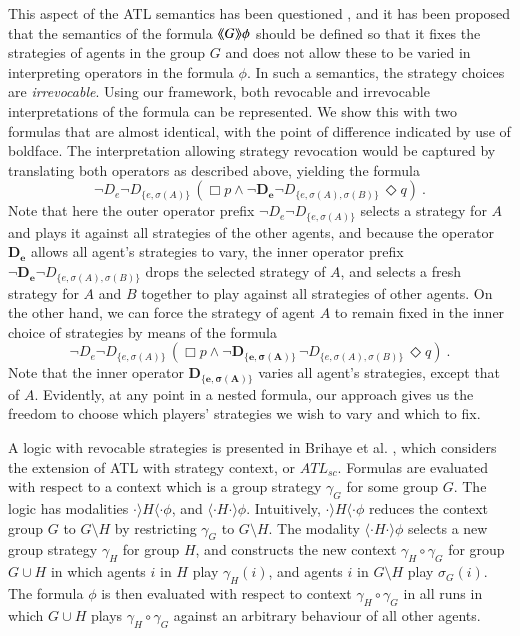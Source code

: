 \documentclass[a4wide]{article}
\theoremstyle{examplesty}
\newcommand{\strat}{\sigma}
\newcommand{\atlop}[1]{\langle\hspace{-2pt}\langle #1 \rangle \hspace{-2pt}\rangle }
\newcommand{\always}{\Box}
\newcommand{\sometimes}{\Diamond}
\begin{document}
This aspect of the ATL semantics has been questioned 
\cite{AgotnesGJ07}, and it has been proposed that the semantics of the formula
$\atlop{G} \phi$ should be defined so that it fixes the strategies of agents in 
the group $G$ and does not allow these to be varied in interpreting operators in the 
formula $\phi$. In such a semantics, the strategy choices are \emph{irrevocable}. 
Using our framework, both revocable and irrevocable interpretations of the formula can be represented. 
We show this with two formulas that 
are almost identical, with the point of difference indicated by use of boldface.
The interpretation allowing strategy revocation would be captured
by translating both operators as described above, yielding the formula 
$$ \neg D_{e} \neg D_{\{e,\strat(A)\} }\,( \always p \land  \neg \mathbf{D_{e}} \neg D_{\{e,\strat(A),\strat(B)\} } \,\sometimes q)~.$$ 
Note that here the outer operator prefix $\neg D_{e} \neg D_{\{e,\strat(A)\} }$ selects a strategy for $A$ and plays it against 
all strategies of the other agents, and because the operator $\mathbf{D_{e}}$ allows all agent's strategies to vary, 
the inner operator prefix $\neg \mathbf{D_{e}} \neg D_{\{e,\strat(A),\strat(B)\} }$ 
drops the selected strategy of $A$, and selects a fresh strategy for $A$ and $B$ together to play against all strategies of other agents. 
On the other hand, we can force the strategy of agent $A$ to remain fixed
in the inner choice of strategies by  means of the formula
$$ \neg D_{e} \neg D_{\{e,\strat(A)\} }\,( \always p \land  \neg \mathbf{D_{\{e,\strat(A)\}}}\, \neg D_{\{e,\strat(A),\strat(B)\} } \, \sometimes q)~.$$  
Note that the inner operator $\mathbf{D_{\{e,\strat(A)\}}}$ varies all agent's strategies, except that of $A$. 
Evidently, at any point in a nested formula, our approach gives us the freedom
to choose which players' strategies we wish to vary and which  to fix. 



A logic with 
revocable strategies is presented in
Brihaye et al. \cite{BCLM2009},  which 
considers the extension of ATL with strategy context, or $ATL_{sc}$. 
Formulas are evaluated with respect to a context which is a group strategy $\gamma_G$ for some group $G$. 
The logic has modalities $\cdot\rangle H \langle\cdot\phi$, and $ \langle\cdot H \cdot\rangle\phi$.  
Intuitively,  $\cdot\rangle H \langle\cdot\phi$ reduces the context group $G$ to $G\setminus H$ by restricting $\gamma_G$ to $G \setminus H$. 
The modality $ \langle\cdot H \cdot\rangle\phi$ selects a new group strategy $\gamma_H$ for group $H$, 
and constructs the new context $\gamma_H\circ \gamma_G$ for group $G \cup H$ in which agents $i$ in $H$ play $\gamma_H(i)$, 
and agents $i$ in $G\setminus H$ play $\strat_G(i)$. The formula $\phi$ is then evaluated with respect to context 
 $\gamma_H\circ \gamma_G$ in all 
runs in which $G \cup H$ plays $\gamma_H\circ \gamma_G$ against an arbitrary behaviour of all other agents. 
\end{document}
